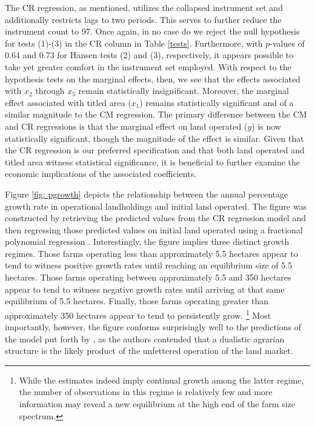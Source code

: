 \documentclass[english]{article}
\begin{document}
The CR regression, as mentioned, utilizes the collapsed instrument set and 
additionally restricts lags to two periods.
This serves to further reduce the instrument count to 97.
Once again, in no case do we reject the null hypothesis for tests (1)-(3) in the 
CR column in Table \ref{tests}. 
Furthermore, with $p$-values of 0.64 and 0.73 for Hansen tests (2) and (3), 
respectively, it appears possible to take yet greater comfort in the instrument 
set employed.
With respect to the hypothesis tests on the marginal effects, then, we see that 
the effects associated with $x_2$ through $x_5$ remain statistically 
insignificant.  
Moreover, the marginal effect associated with titled area ($x_1$) remains 
statistically significant and of a similar magnitude to the CM regression.
The primary difference between the CM and CR regressions is that the 
marginal effect on land operated ($y$) is now statistically significant, 
though the magnitude of the effect is similar.
Given that the CR regression is our preferred specification and that both 
land operated and titled area witness statistical significance, it is beneficial
to further examine the economic implications of the associated 
coefficients.

Figure \ref{fig: pgrowth} depicts the relationship between the annual 
percentage growth rate in operational landholdings and initial land 
operated.
The figure was constructed by retrieving the predicted values from the 
CR regression model and then regressing those predicted values on 
initial land operated using a fractional polynomial regression 
\citep{royston1994}.
Interestingly, the figure implies three distinct growth regimes.
Those farms operating less than approximately 5.5 hectares appear to tend
to witness positive growth rates until reaching an equilibrium size of 5.5 
hectares.
Those farms operating between approximately 5.5 and 350 hectares appear
to tend to witness negative growth rates until arriving at that same 
equilibrium of 5.5 hectares.
Finally, those farms operating greater than approximately 350 hectares 
appear to tend to persistently grow.%
\footnote{While the estimates indeed imply continual growth among the 
latter regime, the number of observations in this regime is relatively few and 
more information may reveal a new equilibrium at the high end of the farm 
size spectrum.}
Most importantly, however, the figure conforms surprisingly well to the 
predictions of the model put forth by \citet{carter1993}, as the authors
contended that a dualistic agrarian structure is the likely product of the 
unfettered operation of the land market.
\end{document}
